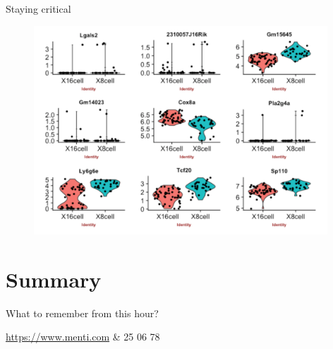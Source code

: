 \documentclass{beamer}\usepackage[]{graphicx}\usepackage[]{color}
\begin{document}
\begin{frame}
\begin{block}{Staying critical}
\begin{center}
\begin{figure}
\includegraphics[width=11cm]{Images/asa1.png}
\end{figure}
\end{center}
\end{block}
\end{frame}

\section{Summary}

\begin{frame}
\begin{center}
\colorbox{blue!10}{What to remember from this hour?}
\end{center}
\begin{center}
\href{https://www.menti.com}{https://www.menti.com} \& 25 06 78%
\end{center}
\end{frame}
\end{document}
